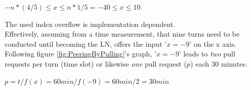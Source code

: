 \begin{center}
	$-n*(4/5) \leq x \leq n*1/5 = -40 \leq x \leq 10$.
\end{center}

\noindent The used index overflow is implementation dependent. \\
Effectively, assuming from a time measurement, that nine turns need to be conducted until becoming the \gls{LN}, offers the input '$x = -9$' on the x axis.
Following figure \ref{fig:PeeringByPulling}'s graph, '$x=-9$' leads to \textit{two} pull requests per turn (time slot) or likewise \textit{one} pull request ($p$) each 30 minutes.

\begin{center}
	$p = t/f(x) = 60min/f(-9) = 60min/2 = 30min$
\end{center}

